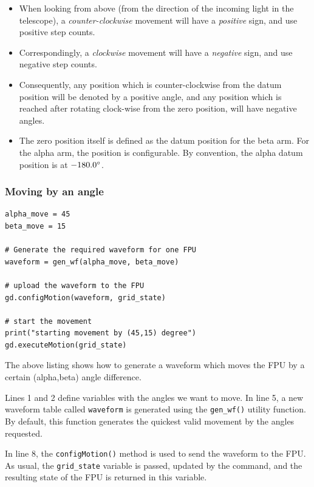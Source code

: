 \documentclass[11pt,a4paper]{scrartcl}
\begin{document}
\begin{itemize}
  \item When looking from above (from the direction of the incoming
    light in the telescope), a \emph{counter-clockwise} movement will
    have a \emph{positive} sign, and use positive step counts.
  \item Correspondingly, a \emph{clockwise} movement will have a
    \emph{negative} sign, and use negative step counts.
  \item Consequently, any position which is counter-clockwise from the
    datum position will be denoted by a positive angle, and any
    position which is reached after rotating clock-wise from the zero
    position, will have negative angles.
  \item The zero position itself is defined as the datum position for
    the beta arm. For the alpha arm, the position is configurable. By
    convention, the alpha datum position is at $-180.0\degree$.
\end{itemize}

\subsubsection{Moving by an angle}
\begin{verbatim}
alpha_move = 45
beta_move = 15

# Generate the required waveform for one FPU
waveform = gen_wf(alpha_move, beta_move)

# upload the waveform to the FPU
gd.configMotion(waveform, grid_state)

# start the movement
print("starting movement by (45,15) degree")
gd.executeMotion(grid_state)
\end{verbatim}

The above listing shows how to generate a waveform which moves the FPU
by a certain (alpha,beta) angle difference.

Lines 1 and 2 define variables with the angles we want to move. In
line 5, a new waveform table called \texttt{waveform} is generated
using the \texttt{gen\_wf()} utility function.  By default, this
function generates the quickest valid movement by the angles
requested.

In line 8, the \texttt{configMotion()} method is used to send the
waveform to the FPU. As usual, the \texttt{grid\_state} variable is
passed, updated by the command, and the resulting state of the FPU is
returned in this variable.
\end{document}
